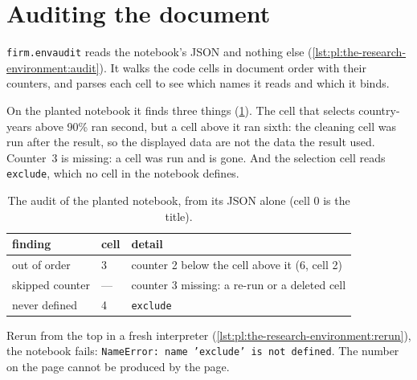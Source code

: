 \section{Auditing the document}

\texttt{firm.envaudit} reads the notebook's JSON and nothing else (\cref{lst:pl:the-research-environment:audit}). It walks the code cells
in document order with their counters, and parses each cell to see which names it reads and which it binds.

\label{lst:pl:the-research-environment:audit}

On the planted notebook it finds three things (\cref{tab:pl:the-research-environment:audit}). The cell that selects country-years above 90\%
ran second, but a cell above it ran sixth: the cleaning cell was run after the result, so the displayed data are not the data the result
used. Counter~3 is missing: a cell was run and is gone. And the selection cell reads \texttt{exclude}, which no cell in the notebook defines.

\begin{table}[ht]
\centering\small
\begin{tabular}{llp{7.4cm}}
\toprule
finding & cell & detail \\
\midrule
out of order & 3 & counter 2 below the cell above it (6, cell 2) \\
skipped counter & --- & counter 3 missing: a re-run or a deleted cell \\
never defined & 4 & \texttt{exclude} \\
\bottomrule
\end{tabular}
\caption{The audit of the planted notebook, from its JSON alone (cell 0 is the title).}\label{tab:pl:the-research-environment:audit}
\end{table}

Rerun from the top in a fresh interpreter (\cref{lst:pl:the-research-environment:rerun}), the notebook fails: \texttt{NameError: name
'exclude' is not defined}. The number on the page cannot be produced by the page.

\label{lst:pl:the-research-environment:rerun}

